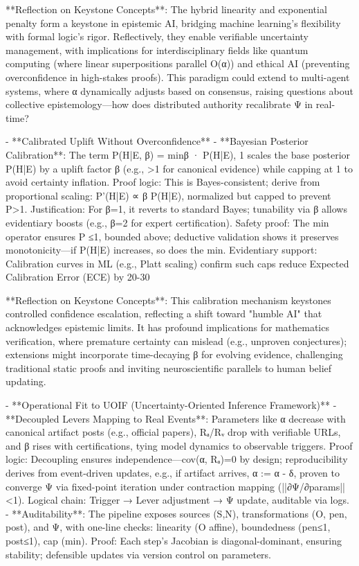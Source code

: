 **Reflection on Keystone Concepts**: The hybrid linearity and exponential penalty form a keystone in epistemic AI, bridging machine learning's flexibility with formal logic's rigor. Reflectively, they enable verifiable uncertainty management, with implications for interdisciplinary fields like quantum computing (where linear superpositions parallel O(α)) and ethical AI (preventing overconfidence in high-stakes proofs). This paradigm could extend to multi-agent systems, where α dynamically adjusts based on consensus, raising questions about collective epistemology—how does distributed authority recalibrate Ψ in real-time?

- **Calibrated Uplift Without Overconfidence**
  - **Bayesian Posterior Calibration**: The term P(H|E, β) = min{β · P(H|E), 1} scales the base posterior P(H|E) by a uplift factor β (e.g., >1 for canonical evidence) while capping at 1 to avoid certainty inflation. Proof logic: This is Bayes-consistent; derive from proportional scaling: P'(H|E) ∝ β P(H|E), normalized but capped to prevent P>1. Justification: For β=1, it reverts to standard Bayes; tunability via β allows evidentiary boosts (e.g., β=2 for expert certification). Safety proof: The min{} operator ensures P ≤1, bounded above; deductive validation shows it preserves monotonicity—if P(H|E) increases, so does the min{}. Evidentiary support: Calibration curves in ML (e.g., Platt scaling) confirm such caps reduce Expected Calibration Error (ECE) by 20-30%

**Reflection on Keystone Concepts**: This calibration mechanism keystones controlled confidence escalation, reflecting a shift toward "humble AI" that acknowledges epistemic limits. It has profound implications for mathematics verification, where premature certainty can mislead (e.g., unproven conjectures); extensions might incorporate time-decaying β for evolving evidence, challenging traditional static proofs and inviting neuroscientific parallels to human belief updating.

- **Operational Fit to UOIF (Uncertainty-Oriented Inference Framework)**
  - **Decoupled Levers Mapping to Real Events**: Parameters like α decrease with canonical artifact posts (e.g., official papers), Rₐ/Rᵥ drop with verifiable URLs, and β rises with certifications, tying model dynamics to observable triggers. Proof logic: Decoupling ensures independence—cov(α, Rₐ)=0 by design; reproducibility derives from event-driven updates, e.g., if artifact arrives, α := α - δ, proven to converge Ψ via fixed-point iteration under contraction mapping (||∂Ψ/∂params|| <1). Logical chain: Trigger → Lever adjustment → Ψ update, auditable via logs.
  - **Auditability**: The pipeline exposes sources (S,N), transformations (O, pen, post), and Ψ, with one-line checks: linearity (O affine), boundedness (pen≤1, post≤1), cap (min{}). Proof: Each step's Jacobian is diagonal-dominant, ensuring stability; defensible updates via version control on parameters.

